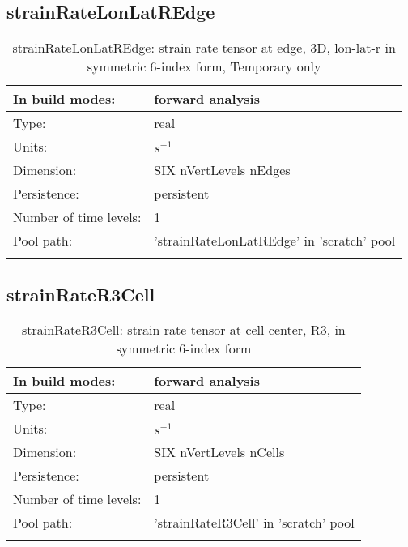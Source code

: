 \subsection[strainRateLonLatREdge]{strainRateLonLatREdge}
\label{subsec:var_sec_scratch_strainRateLonLatREdge}
\begin{center}
\begin{longtable}{| p{2.0in} | p{4.0in} |}
        \hline 
        In build modes: & \hyperref[subsec:forward_var_tab_scratch]{forward} \hyperref[subsec:analysis_var_tab_scratch]{analysis} \\
        \hline 
        Type: & real \\
        \hline 
        Units: & $s^{-1}$ \\
        \hline 
        Dimension: & SIX nVertLevels nEdges \\
        \hline 
        Persistence: & persistent \\
        \hline 
        Number of time levels: & 1 \\
        \hline 
            Pool path: & 'strainRateLonLatREdge' in 'scratch' pool
 \\
		 \hline 
    \caption{strainRateLonLatREdge: strain rate tensor at edge, 3D, lon-lat-r in symmetric 6-index form, {\color{red}Temporary only}}
\end{longtable}
\end{center}
\subsection[strainRateR3Cell]{strainRateR3Cell}
\label{subsec:var_sec_scratch_strainRateR3Cell}
\begin{center}
\begin{longtable}{| p{2.0in} | p{4.0in} |}
        \hline 
        In build modes: & \hyperref[subsec:forward_var_tab_scratch]{forward} \hyperref[subsec:analysis_var_tab_scratch]{analysis} \\
        \hline 
        Type: & real \\
        \hline 
        Units: & $s^{-1}$ \\
        \hline 
        Dimension: & SIX nVertLevels nCells \\
        \hline 
        Persistence: & persistent \\
        \hline 
        Number of time levels: & 1 \\
        \hline 
            Pool path: & 'strainRateR3Cell' in 'scratch' pool
 \\
		 \hline 
    \caption{strainRateR3Cell: strain rate tensor at cell center, R3, in symmetric 6-index form}
\end{longtable}
\end{center}

